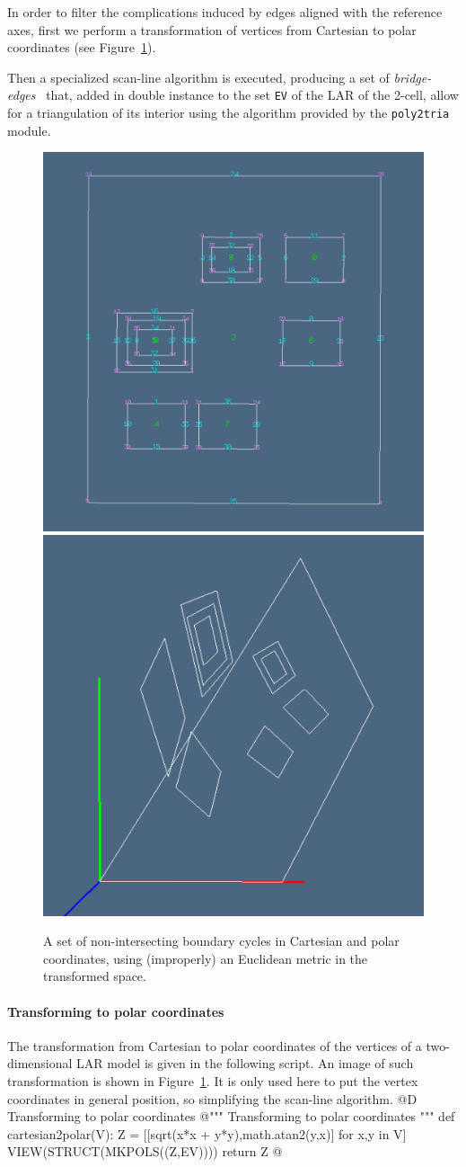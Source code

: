 \documentclass[11pt,oneside]{article}	%
\begin{document}
In order to filter the complications induced by edges aligned with the reference axes, first we perform a transformation of vertices from Cartesian to polar coordinates (see Figure~\ref{fig:polarholes}).

Then a specialized scan-line algorithm is executed, producing a set of \emph{bridge-edges}~\cite{Yamaguchi:85} that, added in double instance to the set \texttt{EV} of the LAR of the 2-cell, allow for a triangulation of its interior using the algorithm provided by the \texttt{poly2tria} module.

\begin{figure}[htbp] %
   \centering
   \includegraphics[height=0.33\linewidth,width=0.33\linewidth]{images/lattice1} 
   \includegraphics[height=0.33\linewidth,width=0.33\linewidth]{images/polarholes} 
   \caption{A set of non-intersecting boundary cycles in Cartesian and polar coordinates, using (improperly) an Euclidean metric in the transformed space.}
   \label{fig:polarholes}
\end{figure}


\paragraph{Transforming to polar coordinates}

The transformation from Cartesian to polar coordinates of the vertices of a two-dimensional LAR model is given in the following script. An image of such transformation is shown in Figure~\ref{fig:polarholes}. It is only used here to put the vertex coordinates in general position, so simplifying the scan-line algorithm.
@D Transforming to polar coordinates 
@{""" Transforming to polar coordinates """
def cartesian2polar(V):    
    Z = [[sqrt(x*x + y*y),math.atan2(y,x)] for x,y in V]
    VIEW(STRUCT(MKPOLS((Z,EV))))
    return Z
@}
\end{document}
